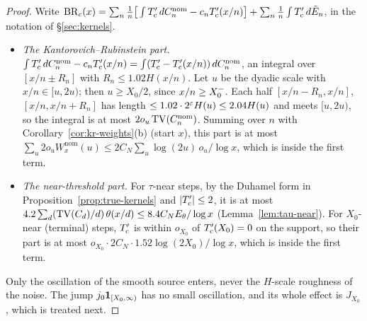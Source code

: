 \begin{proof}
Write $\mathrm{BR}_c(x)=\sum_n\frac1n\big[\int T'_{\mathrm{c}}\,dC_n^{\mathrm{nom}}-c_nT'_{\mathrm{c}}(x/n)\big]+\sum_n\frac1n\int T'_{\mathrm{c}}\,d\tilde E_n$, in the
notation of \S\ref{sec:kernels}.
\begin{itemize}
\item \emph{The Kantorovich--Rubinstein part.} $\int T'_{\mathrm{c}}\,dC_n^{\mathrm{nom}}-c_nT'_{\mathrm{c}}(x/n)=\int(T'_{\mathrm{c}}-T'_{\mathrm{c}}(x/n))\,dC_n^{\mathrm{nom}}$, an
  integral over $[x/n\pm R_n]$ with $R_n\le1.02H(x/n)$. Let $u$ be the dyadic scale with $x/n\in[u,2u)$; then $u\ge X_0/2$,
  since $x/n\ge X_0^{-}$. Each half $[x/n-R_n,x/n]$, $[x/n,x/n+R_n]$ has length $\le1.02\cdot2^{\varepsilon}H(u)\le2.04H(u)$ and meets
  $[u,2u)$, so the integral is at most $2o_u\operatorname{TV}(C_n^{\mathrm{nom}})$. Summing over $n$ with Corollary~\ref{cor:kr-weights}(b)
  (start $x$), this part is at most $\sum_u2o_uW^{\mathrm{nom}}_x(u)\le2C_N\sum_u\log(2u)\,o_u/\log x$, which is inside the
  first term.
\item \emph{The near-threshold part.} For $\tau$-near steps, by the Duhamel form in Proposition~\ref{prop:true-kernels} and
  $|T'_{\mathrm{c}}|\le2$, it is at most $4.2\sum_d(\operatorname{TV}(C_d)/d)\,\theta(x/d)\le8.4C_NE_\theta/\log x$ (Lemma~\ref{lem:tau-near}). For
  $X_0$-near (terminal) steps, $T'_{\mathrm{c}}$ is within $o_{X_0}$ of $T'_{\mathrm{c}}(X_0)=0$ on the support, so their part is at most
  $o_{X_0}\cdot2C_N\cdot1.52\log(2X_0)/\log x$, which is inside the first term.
\end{itemize}
Only the oscillation of the smooth source enters, never the $H$-scale roughness of the noise. The jump
$j_0\mathbf 1_{[X_0,\infty)}$ has no small oscillation, and its whole effect is $J_{X_0}$, which is treated next.
\end{proof}



